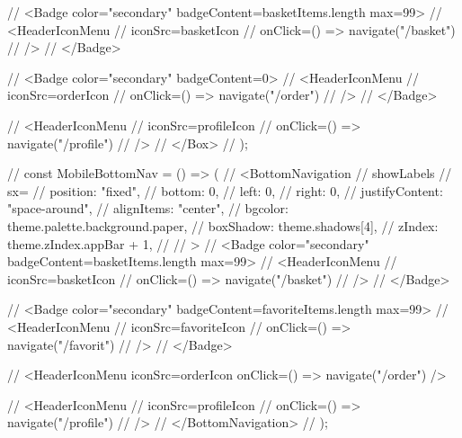 {//       <Badge color="secondary" badgeContent={basketItems.length} max={99}>
//         <HeaderIconMenu
//           iconSrc={basketIcon}
//           onClick={() => navigate("/basket")}
//         />
//       </Badge>

//       <Badge color="secondary" badgeContent={0}>
//         <HeaderIconMenu
//           iconSrc={orderIcon}
//           onClick={() => navigate("/order")}
//         />
//       </Badge>

//       <HeaderIconMenu
//         iconSrc={profileIcon}
//         onClick={() => navigate("/profile")}
//       />
//     </Box>
//   );

//   const MobileBottomNav = () => (
//     <BottomNavigation
//       showLabels
//       sx={{
//         position: "fixed",
//         bottom: 0,
//         left: 0,
//         right: 0,
//         justifyContent: "space-around",
//         alignItems: "center",
//         bgcolor: theme.palette.background.paper,
//         boxShadow: theme.shadows[4],
//         zIndex: theme.zIndex.appBar + 1,
//       }}
//     >
//       <Badge color="secondary" badgeContent={basketItems.length} max={99}>
//         <HeaderIconMenu
//           iconSrc={basketIcon}
//           onClick={() => navigate("/basket")}
//         />
//       </Badge>

//       <Badge color="secondary" badgeContent={favoriteItems.length} max={99}>
//         <HeaderIconMenu
//           iconSrc={favoriteIcon}
//           onClick={() => navigate("/favorit")}
//         />
//       </Badge>

//       <HeaderIconMenu iconSrc={orderIcon} onClick={() => navigate("/order")} />

//       <HeaderIconMenu
//         iconSrc={profileIcon}
//         onClick={() => navigate("/profile")}
//       />
//     </BottomNavigation>
//   );

}

